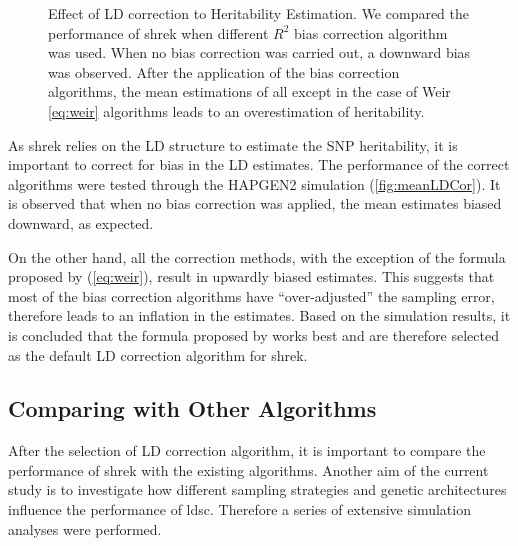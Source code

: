 \begin{figure}
{				\label{fig:varLDCor}
			}
			\caption[Effect of LD correction to Heritability Estimation]
			{Effect of LD correction to Heritability Estimation.
				We compared the performance of \gls{shrek} when different $R^2$ bias correction algorithm was used.
				When no bias correction was carried out, a downward bias was observed. 
				After the application of the bias correction algorithms, the mean estimations of all except in the case of Weir \cref{eq:weir} algorithms leads to an overestimation of heritability.
			} 
			\label{fig:ldCorCom}
		\end{figure}
		As \gls{shrek} relies on the \gls{LD} structure to estimate the \gls{SNP} heritability, it is important to correct for bias in the \gls{LD} estimates. 
		The performance of the correct algorithms were tested through the HAPGEN2 simulation (\cref{fig:meanLDCor}).
		It is observed that when no bias correction was applied, the mean estimates biased downward, as expected.
		
		On the other hand, all the correction methods, with the exception of the formula proposed by \citet{Weir1980} (\cref{eq:weir}), result in upwardly biased estimates.
		This suggests that most of the bias correction algorithms have ``over-adjusted'' the sampling error, therefore leads to an inflation in the estimates.
		Based on the simulation results, it is concluded that the formula proposed by \citet{Weir1980} works best and are therefore selected as the default \gls{LD} correction algorithm for \gls{shrek}.
		
		\subsection{Comparing with Other Algorithms}
		After the selection of \gls{LD} correction algorithm, it is important to compare the performance of \gls{shrek} with the existing algorithms.
		Another aim of the current study is to investigate how different sampling strategies and genetic architectures influence the performance of \gls{ldsc}.
		Therefore a series of extensive simulation analyses were performed. 
		
